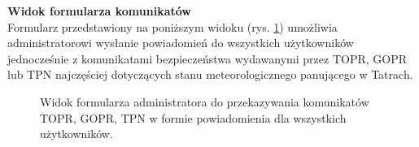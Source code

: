 \noindent
\textbf{Widok formularza komunikatów}\\
\indent Formularz przedstawiony na poniższym widoku (rys. \ref{widok:admindanger}) umożliwia administratorowi wysłanie powiadomień do wszystkich użytkowników jednocześnie z komunikatami bezpieczeństwa wydawanymi przez TOPR, GOPR lub TPN najczęściej dotyczących stanu meteorologicznego panującego w Tatrach.
\begin{figure}[H]
    \centering
    \caption{Widok formularza administratora do przekazywania komunikatów TOPR, GOPR, TPN w formie powiadomienia dla wszystkich użytkowników.}
    \label{widok:admindanger}
\end{figure}

